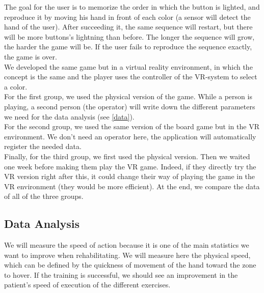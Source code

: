 \documentclass[12pt, openany, twocolumn]{article}
\begin{document}
    The goal for the user is to memorize the order in which the button is lighted, and reproduce it by moving his hand in front of each color (a sensor will detect the hand of the user).
    After succeeding it, the same sequence will restart, but there will be more buttons's lightning than before.
    The longer the sequence will grow, the harder the game will be.
    If the user fails to reproduce the sequence exactly, the game is over.
    \\

    We developed the same game but in a virtual reality environment, in which the concept is the same and the player uses the controller of the VR-system to select a color.
    \\

    For the first group, we used the physical version of the game.
    While a person is playing, a second person (the operator) will write down the different parameters we need for the data analysis (see \ref{data}).
    \\
    
    For the second group, we used the same version of the board game but in the VR environment.
    We don't need an operator here, the application will automatically register the needed data.
    \\

    Finally, for the third group, we first used the physical version. Then we waited one week before making them play the VR game. Indeed, if they directly try the VR version right after this, it could change their way of playing the game in the VR environment (they would be more efficient).
    At the end, we compare the data of all of the three groups.

    \subsection{Data Analysis\label{data}}
    

    
    We will measure the speed of action because it is one of the main statistics we want to improve when rehabilitating. 
    We will measure here the physical speed, which can be defined by the quickness of movement of the hand toward the zone to hover.
    If the training is successful, we should see an improvement in the patient's speed of execution of the different exercises.
    \\
\end{document}
